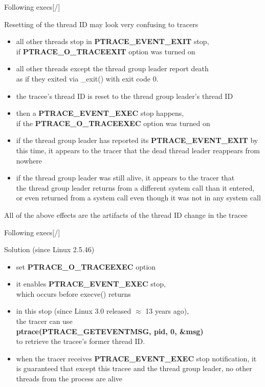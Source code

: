 \documentclass[unicode,aspectratio=169,xcolor={table,dvipsnames,usernames}]{beamer}
\begin{document}
\begin{frame}{\Large Following execs\hfill [\insertframenumber/\inserttotalframenumber]}
\begin{block}{Resetting of the thread ID may look very confusing to tracers}
\begin{itemize}
	\item all other threads stop in \textbf{PTRACE\_EVENT\_EXIT} stop, \\
		if \textbf{PTRACE\_O\_TRACEEXIT} option was turned on
	\item all other threads except the thread group leader report death \\
		as if they exited via \_exit() with exit code 0.
	\item the tracee's thread ID is reset to the thread group leader's thread ID
	\item then a \textbf{PTRACE\_EVENT\_EXEC} stop happens, \\
		if the \textbf{PTRACE\_O\_TRACEEXEC} option was turned on
	\item if the thread group leader has reported its \textbf{PTRACE\_EVENT\_EXIT} by this time,
		it appears to the tracer that the dead thread leader reappears from nowhere
	\item if the thread group leader was still alive, it appears to the tracer that \\
		the thread group leader returns from a different system call than it entered, \\
		or even returned from a system call even though it was not in any system call
\end{itemize}
\end{block}

All of the above effects are the artifacts of the thread ID change in the tracee
\end{frame}

\begin{frame}{\Large Following execs\hfill [\insertframenumber/\inserttotalframenumber]}
\Large
\begin{block}{Solution (since Linux 2.5.46)}
\begin{itemize}
	\item set \textbf{PTRACE\_O\_TRACEEXEC} option
	\item it enables \textbf{PTRACE\_EVENT\_EXEC} stop, \\
		which occurs before execve() returns
	\item in this stop (since Linux 3.0 released $\approx$ 13 years ago), \\
		the tracer can use \\
		\textbf{ptrace(PTRACE\_GETEVENTMSG, pid, 0, \&msg)} \\
		to retrieve the tracee's former thread ID.
	\item when the tracer receives \textbf{PTRACE\_EVENT\_EXEC} stop notification,
		it is guaranteed that except this tracee and the thread group leader,
		no other threads from the process are alive
\end{itemize}
\end{block}
\end{frame}
\end{document}
